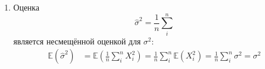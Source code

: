 \documentclass{article}
\begin{document}
\begin{enumerate}
	      Получим, что нормальное распределение
	      принадлежит экспоненциальному семейству.

	      Проверим выполнение условий регулярности:
	      \begin{enumerate}
		      \item Среднее по выборке - несмещённая оценка для $\alpha$
		      \item Функция плотности дифференцируема по $\alpha$:
		            \[
			            \frac{\partial}{\partial \alpha} 
                        f(x, \alpha, \sigma^2) = 
                        \frac{1}{\sqrt{2\pi\sigma^2}} 
                        \frac{x - \alpha}{\sigma^2} 
                        \exp\left(-\frac{(x - \alpha)^2}{2\sigma^2}\right)
		            \]
		      \item Область определения: $x \in (-\infty, \infty)$
		      \item Информация Фишера существует:
		            \[
			            i(\alpha) = 
                        -\mathbb{E}\left(\frac{\partial^2}
                        {\partial \alpha^2} \ln 
                        f(x, \alpha, \sigma^2)\right) = 
                        \frac{1}{\sigma^2}
		            \]
	      \end{enumerate}

	      Тогда среднее по выборке является эффективной оценкой
	      для $\alpha$.

	\item Оценка
	      \[
		      \widehat{\sigma}^2 = \frac{1}{n} \sum_{i}^{n}
	      \]
	      является несмещённой оценкой для $\sigma^2$:
	      \begin{equation*}
		      \begin{aligned}
			      \mathbb{E}( \widehat{\sigma}^2 )
			       & = \mathbb{E}\left( \frac{1}{n} \sum_{i}^{n} X_i^2 \right)  = \frac{1}{n} \sum_{i}^{n} \mathbb{E}(X_i^2) = \frac{1}{n} \sum_{i}^{n} \sigma^2 = \sigma^2
		      \end{aligned}
	      \end{equation*}


\end{enumerate}
\end{document}

